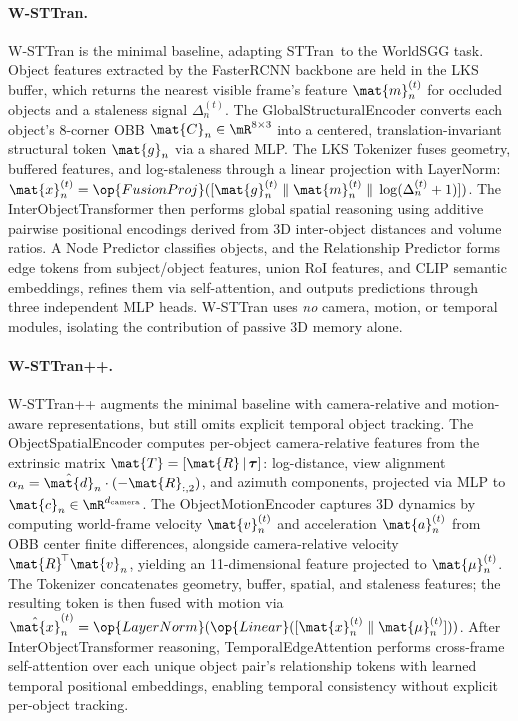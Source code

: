 \paragraph{W-STTran.}
\label{par:wsttran}
W-STTran is the minimal baseline, adapting STTran~to the WorldSGG task. Object features extracted by the FasterRCNN backbone are held in the LKS buffer, which returns the nearest visible frame's feature $\mat{m}_n^{(t)}$ for occluded objects and a staleness signal $\Delta_n^{(t)}$. The GlobalStructuralEncoder converts each object's 8-corner OBB $\mat{C}_n \in \mR^{8\times3}$ into a centered, translation-invariant structural token $\mat{g}_n$ via a shared MLP. The LKS Tokenizer fuses geometry, buffered features, and log-staleness through a linear projection with LayerNorm: $\mat{x}_n^{(t)} = \op{FusionProj}([\mat{g}_n^{(t)} \;\|\; \mat{m}_n^{(t)} \;\|\; \log(\Delta_n^{(t)}+1)])$. The InterObjectTransformer then performs global spatial reasoning using additive pairwise positional encodings derived from 3D inter-object distances and volume ratios. A Node Predictor classifies objects, and the Relationship Predictor forms edge tokens from subject/object features, union RoI features, and CLIP semantic embeddings, refines them via self-attention, and outputs predictions through three independent MLP heads. W-STTran uses \emph{no} camera, motion, or temporal modules, isolating the contribution of passive 3D memory alone.

\paragraph{W-STTran++.}
\label{par:wsttranpp}
W-STTran++ augments the minimal baseline with camera-relative and motion-aware representations, but still omits explicit temporal object tracking. The ObjectSpatialEncoder computes per-object camera-relative features from the extrinsic matrix $\mat{T}=[\mat{R}\,|\,\boldsymbol{\tau}]$: log-distance, view alignment $\alpha_n = \hat{\mat{d}}_n \cdot (-\mat{R}_{:,2})$, and azimuth components, projected via MLP to $\mat{c}_n \in \mR^{d_{\text{camera}}}$. The ObjectMotionEncoder captures 3D dynamics by computing world-frame velocity $\mat{v}_n^{(t)}$ and acceleration $\mat{a}_n^{(t)}$ from OBB center finite differences, alongside camera-relative velocity $\mat{R}^{\!\top}\mat{v}_n$, yielding an 11-dimensional feature projected to $\mat{\mu}_n^{(t)}$. The Tokenizer concatenates geometry, buffer, spatial, and staleness features; the resulting token is then fused with motion via $\hat{\mat{x}}_n^{(t)} = \op{LayerNorm}(\op{Linear}([\mat{x}_n^{(t)} \;\|\; \mat{\mu}_n^{(t)}]))$. After InterObjectTransformer reasoning, TemporalEdgeAttention performs cross-frame self-attention over each unique object pair's relationship tokens with learned temporal positional embeddings, enabling temporal consistency without explicit per-object tracking.

